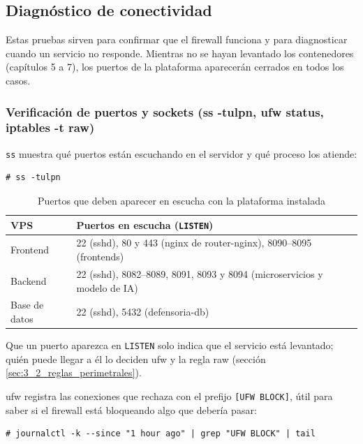 \subsection{Diagnóstico de conectividad}\label{sec:3_3_diagnostico_conectividad}
Estas pruebas sirven para confirmar que el firewall funciona y para diagnosticar cuando un servicio no responde. Mientras no se hayan levantado los contenedores (capítulos 5 a 7), los puertos de la plataforma aparecerán cerrados en todos los casos.

\subsubsection{Verificación de puertos y sockets (ss -tulpn, ufw status, iptables -t raw)}
\texttt{ss} muestra qué puertos están escuchando en el servidor y qué proceso los atiende:
\begin{lstlisting}
# ss -tulpn
\end{lstlisting}
\begin{table}[H]
\centering
\caption{Puertos que deben aparecer en escucha con la plataforma instalada}
\small
\begin{tabular}{lp{10.5cm}}
\toprule
\textbf{VPS} & \textbf{Puertos en escucha (\texttt{LISTEN})} \\
\midrule
Frontend & 22 (sshd), 80 y 443 (nginx de router-nginx), 8090--8095 (frontends) \\
Backend & 22 (sshd), 8082--8089, 8091, 8093 y 8094 (microservicios y modelo de IA) \\
Base de datos & 22 (sshd), 5432 (defensoria-db) \\
\bottomrule
\end{tabular}
\end{table}
Que un puerto aparezca en \texttt{LISTEN} solo indica que el servicio está levantado; quién puede llegar a él lo deciden ufw y la regla raw (sección \ref{sec:3_2_reglas_perimetrales}).

ufw registra las conexiones que rechaza con el prefijo \texttt{[UFW BLOCK]}, útil para saber si el firewall está bloqueando algo que debería pasar:
\begin{lstlisting}
# journalctl -k --since "1 hour ago" | grep "UFW BLOCK" | tail
\end{lstlisting}

